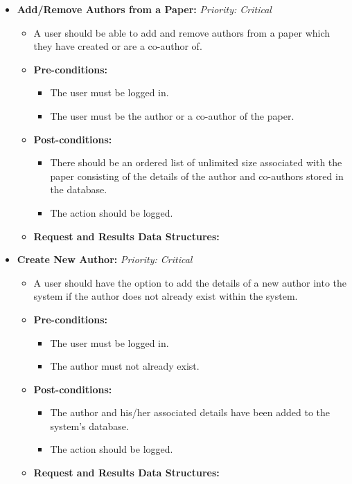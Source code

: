 \documentclass{article}
\begin{document}
\begin{itemize}
					\item \textbf{Add/Remove Authors from a Paper:} \hfill \textit{Priority: Critical}
					\begin{itemize}
						\item A user should be able to add and remove authors from a paper which they have created or are a co-author of.
						\item \textbf{Pre-conditions:}
						\begin{itemize}
							\item The user must be logged in.
							\item The user must be the author or a co-author of the paper.
						\end{itemize}
						\item \textbf{Post-conditions:}
						\begin{itemize}
							\item There should be an ordered list of unlimited size associated with the paper consisting of the details of the author and co-authors stored in the database.
							\item The action should be logged.
						\end{itemize}
						\item \textbf{Request and Results Data Structures:}
					\end{itemize}
					
					\item \textbf{Create New Author:} \hfill \textit{Priority: Critical}
					\begin{itemize}
						\item A user should have the option to add the details of a new author into the system if the author does not already exist within the system.
						\item \textbf{Pre-conditions:}
						\begin{itemize}
							\item The user must be logged in.
							\item The author must not already exist. 
						\end{itemize}
						\item \textbf{Post-conditions:}
						\begin{itemize}
							\item The author and his/her associated details have been added to the system's database.
							\item The action should be logged.
						\end{itemize}
						\item \textbf{Request and Results Data Structures:}
					\end{itemize}
					

\end{itemize}
\end{document}
